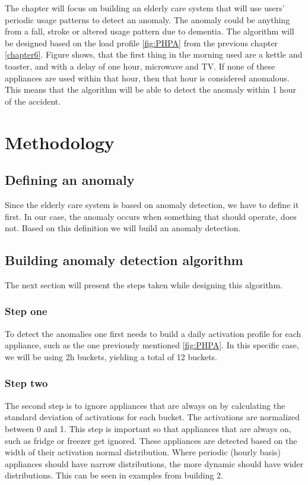 The chapter will focus on building an elderly care system that will use users' periodic usage patterns to detect an anomaly.
The anomaly could be anything from a fall, stroke or altered usage pattern due to dementia. 
The algorithm will be designed based on the load profile \ref{fig:PHPA} from the previous chapter \ref{chapter6}.
Figure shows, that the first thing in the morning used are a kettle and toaster, and with a delay of one hour, microwave and TV. 
If none of these appliances are used within that hour, then that hour is considered anomalous.
This means that the algorithm will be able to detect the anomaly within 1 hour of the accident.

\section{Methodology}

\subsection{Defining an anomaly}

Since the elderly care system is based on anomaly detection, we have to define it first.
In our case, the anomaly occurs when something that should operate, does not. 
Based on this definition we will build an anomaly detection. 

\subsection{Building anomaly detection algorithm}

The next section will present the steps taken while designing this algorithm.

\subsubsection{Step one}
To detect the anomalies one first needs to build a daily activation profile for each appliance, such as the one previously mentioned \ref{fig:PHPA}.
In this specific case, we will be using 2h buckets, yielding a total of 12 buckets. 

\subsubsection{Step two}
The second step is to ignore appliances that are always on by calculating the standard deviation of activations for each bucket. 
The activations are normalized between 0 and 1. 
This step is important so that appliances that are always on, such as fridge or freezer get ignored. 
These appliances are detected based on the width of their activation normal distribution. 
Where periodic (hourly basis) appliances should have narrow distributions, the more dynamic should have wider distributions.
This can be seen in examples from building 2.

